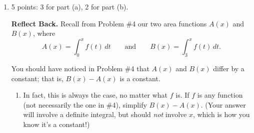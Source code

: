 \documentclass{article}
\begin{document}
\begin{enumerate}



\item 

\begin{grading}
5 points: 3 for part (a), 2 for part (b).
\end{grading}

\textbf{Reflect Back.} Recall from Problem {{\#4}} our two area functions $A(x)$ and $B(x)$, where
  $$
  A (x) = \int^x_0 f(t)\,dt\qquad \text{and} \qquad B(x) = \int^x_3
  f(t)\,dt.
  $$

You should have noticed in Problem {{\#4}} that $A(x)$ and $
  B(x)$ differ by a constant; that is, $B(x) - {}A(x)$ is a
  constant.

  \begin{enumerate}
  \item
    \begin{problem}[\vfill]
      In fact, this is always the case, no matter what $f$ is.  If $f$ is
      any function (not necessarily the one in {{\#4}}),
      simplify $B(x) - A(x)$.  (Your answer will involve a
      definite integral, but should \emph{not} involve $x$, which is how
      you know it's a constant!)
    \end{problem}


\end{enumerate}
\end{enumerate}
\end{document}
